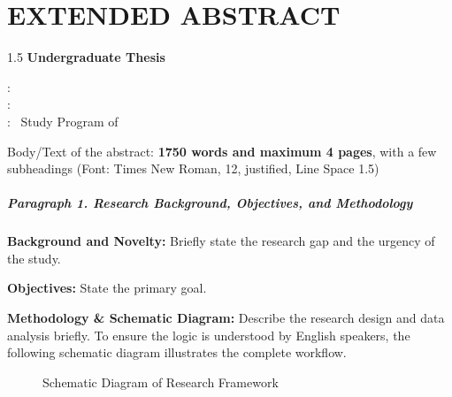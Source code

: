 %
%
%

\chapter*{\fontsize{14pt}{16pt}\selectfont \textbf{EXTENDED ABSTRACT}}
\vspace{-0.5cm}
\begin{center}
	\begin{spacing}{1.5}
	{\fontsize{14pt}{16pt}\selectfont \textbf{Undergraduate Thesis}}\\ [0.3cm]
	{\fontsize{14pt}{16pt}\selectfont \textbf{\judulInggris}}\end{spacing}
\end{center}
\vspace{-2cm}
\begin{singlespace}
		\begin{center}
		 : \penulis \\ 
		 : {\npm}\\
		 : \jenjanginggris~Study Program of~\bidanginggris
	\end{center}
\end{singlespace}




\vspace*{0cm}

Body/Text of the abstract: {\bf 1750 words and maximum 4 pages}, with a few subheadings (Font: Times New Roman, 12, justified, Line Space 1.5)

\noindent \paragraph{Paragraph 1. Research Background, Objectives, and Methodology}

\textbf{Background and Novelty:} Briefly state the research gap and the urgency of the study.

\noindent \textbf{Objectives:} State the primary goal.

\noindent \textbf{Methodology \& Schematic Diagram:} Describe the research design and data analysis briefly. To ensure the logic is understood by English speakers, the following schematic diagram illustrates the complete workflow.

\begin{figure}[h]
	\centering
	\caption{Schematic Diagram of Research Framework}
\end{figure}

